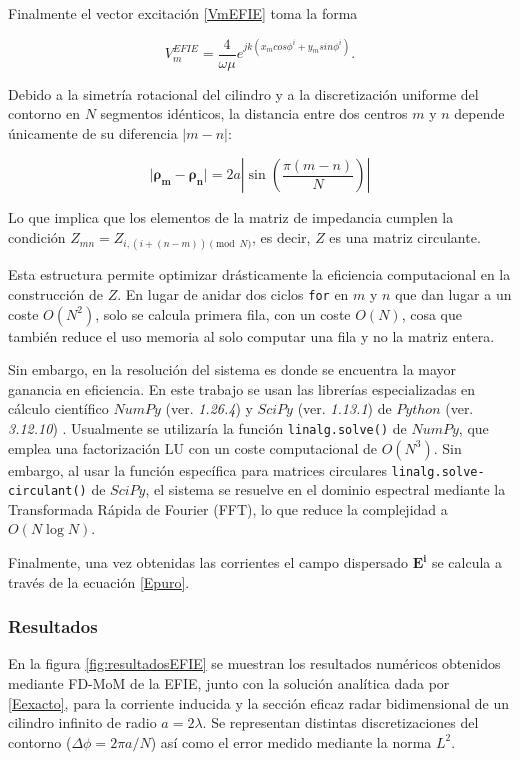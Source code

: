 \documentclass[11pt,a4paper,twoside,pdf]{article}
\numberwithin{equation}{section}
\begin{document}
Finalmente el vector excitación \ref{VmEFIE} toma la forma

$$
    V^{EFIE}_m = \frac{4}{\omega \mu} e^{jk (x_m cos\phi^i + y_m sin\phi^i)}.
$$



Debido a la simetría rotacional del cilindro y a la discretización uniforme del contorno en $N$ segmentos idénticos, la distancia entre dos centros $m$ y $n$ depende únicamente de su diferencia $|m-n|$:

$$\lvert \boldsymbol{\rho_m} - \boldsymbol{\rho_n} \rvert = 2a \left| \sin\left( \frac{\pi(m-n)}{N} \right) \right|$$

Lo que implica que los elementos de la matriz de impedancia cumplen la condición $Z_{mn} = Z_{i, (i+(n-m)) \pmod N}$, es decir, $Z$ es una matriz circulante.\newline

Esta estructura permite optimizar drásticamente la eficiencia computacional en la construcción de $Z$. En lugar de anidar dos ciclos \texttt{for} en $m$ y $n$ que dan lugar a un coste $O(N^2)$, solo se calcula primera fila, con un coste $O(N)$, cosa que también reduce el uso memoria al solo computar una fila y no la matriz entera.

Sin embargo, en la resolución del sistema es donde se encuentra la mayor ganancia en eficiencia. En este trabajo se usan las librerías especializadas en cálculo científico $NumPy$ (ver. \textit{1.26.4}) y $SciPy$ (ver. \textit{1.13.1}) de $Python$ (ver. \textit{3.12.10}) \cite{harris2020array, 2020SciPy-NMeth}. Usualmente se utilizaría la función \texttt{linalg.solve()} de $NumPy$, que emplea una factorización LU con un coste computacional de $O(N^3)$. Sin embargo, al usar la función específica para matrices circulares \texttt{linalg.solve-circulant()} de $SciPy$, el sistema se resuelve en el dominio espectral mediante la Transformada Rápida de Fourier (FFT), lo que reduce la complejidad a $O(N \log N)$.

Finalmente, una vez obtenidas las corrientes el campo dispersado $\boldsymbol{E^i}$ se calcula a través de la ecuación \ref{Epuro}.\\


\subsubsection{Resultados}



En la figura \ref{fig:resultadosEFIE} se muestran los resultados numéricos obtenidos mediante FD-MoM de la EFIE, junto con la solución analítica dada por \ref{Eexacto}, para la corriente inducida y la sección eficaz radar bidimensional de un cilindro infinito de radio $a = 2\lambda$. Se representan distintas discretizaciones del contorno ($\Delta \phi = 2\pi a/ N$) así como el error medido mediante la norma $L^2$.
\end{document}
